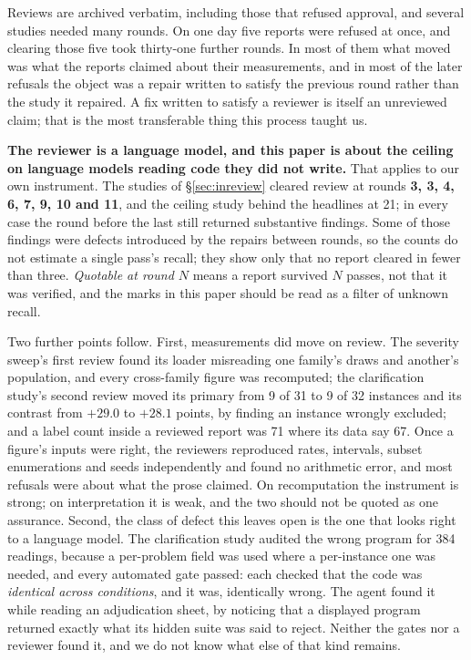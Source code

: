 Reviews are archived verbatim, including those that refused approval, and several studies needed
many rounds. On one day five reports were refused at once, and clearing those five took
thirty-one further rounds. In most of them what moved was what the reports claimed about their
measurements, and in most of the later refusals the object was a repair written to satisfy the
previous round rather than the study it repaired. A fix written to satisfy a reviewer is itself an
unreviewed claim; that is the most transferable thing this process taught us.

\textbf{The reviewer is a language model, and this paper is about the ceiling on language models
reading code they did not write.} That applies to our own instrument. The studies of
\S\ref{sec:inreview} cleared review at rounds \textbf{3, 3, 4, 6, 7, 9, 10 and 11}, and the
ceiling study behind the headlines at 21; in every case the round before the last still returned
substantive findings. Some of those findings were defects introduced by the repairs between
rounds, so the counts do not estimate a single pass's recall; they show only that no report
cleared in fewer than three. \emph{Quotable at round $N$} means a report survived $N$ passes, not
that it was verified, and the marks in this paper should be read as a filter of unknown recall.

Two further points follow. First, measurements did move on review. The severity sweep's first
review found its loader misreading one family's draws and another's population, and every
cross-family figure was recomputed; the clarification study's second review moved its primary
from 9 of 31 to 9 of 32 instances and its contrast from $+29.0$ to $+28.1$ points, by finding an
instance wrongly excluded; and a label count inside a reviewed report was 71 where its data say
67. Once a figure's inputs were right, the reviewers reproduced rates, intervals, subset
enumerations and seeds independently and found no arithmetic error, and most refusals were about
what the prose claimed. On recomputation the instrument is strong; on interpretation it is weak,
and the two should not be quoted as one assurance. Second, the class of defect this leaves open is
the one that looks right to a language model. The clarification study audited the wrong program
for 384 readings, because a per-problem field was used where a per-instance one was needed, and
every automated gate passed: each checked that the code was \emph{identical across conditions},
and it was, identically wrong. The agent found it while reading an adjudication sheet, by noticing
that a displayed program returned exactly what its hidden suite was said to reject. Neither the
gates nor a reviewer found it, and we do not know what else of that kind remains.

